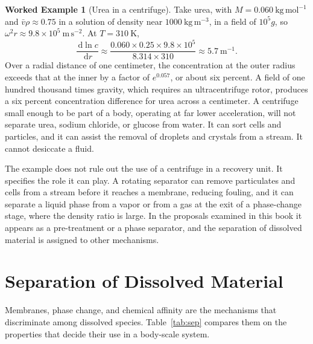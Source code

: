 \documentclass[11pt,openany]{book}
\theoremstyle{definition}
\newtheorem{example}{Worked Example}[chapter]
\theoremstyle{remark}
\newcommand{\dd}{\,\mathrm{d}}
\begin{document}
\begin{example}[Urea in a centrifuge]
\label{ex:urea}
Take urea, with $M=0.060\ \mathrm{kg\,mol^{-1}}$ and $\bar v\rho\approx0.75$ in a solution of density near $1000\ \mathrm{kg\,m^{-3}}$, in a field of $10^{5}g$, so $\omega^2 r\approx9.8\times10^{5}\ \mathrm{m\,s^{-2}}$. At $T=310\ \mathrm{K}$,
\[
\frac{\dd\ln c}{\dd r}\approx\frac{0.060\times0.25\times9.8\times10^{5}}{8.314\times310}\approx5.7\ \mathrm{m^{-1}}.
\]
Over a radial distance of one centimeter, the concentration at the outer radius exceeds that at the inner by a factor of $e^{0.057}$, or about six percent. A field of one hundred thousand times gravity, which requires an ultracentrifuge rotor, produces a six percent concentration difference for urea across a centimeter. A centrifuge small enough to be part of a body, operating at far lower acceleration, will not separate urea, sodium chloride, or glucose from water. It can sort cells and particles, and it can assist the removal of droplets and crystals from a stream. It cannot desiccate a fluid.
\end{example}

The example does not rule out the use of a centrifuge in a recovery unit. It specifies the role it can play. A rotating separator can remove particulates and cells from a stream before it reaches a membrane, reducing fouling, and it can separate a liquid phase from a vapor or from a gas at the exit of a phase-change stage, where the density ratio is large. In the proposals examined in this book it appears as a pre-treatment or a phase separator, and the separation of dissolved material is assigned to other mechanisms.

\section{Separation of Dissolved Material}

Membranes, phase change, and chemical affinity are the mechanisms that discriminate among dissolved species. Table~\ref{tab:sep} compares them on the properties that decide their use in a body-scale system.
\end{document}
